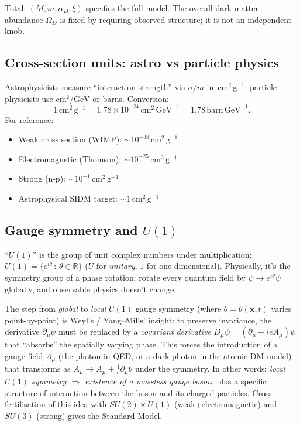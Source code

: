 \documentclass[12pt]{article}
\newcommand{\cmg}{\,\mathrm{cm^2\,g^{-1}}}
\begin{document}
Total: $(M, m, \alpha_D, \xi)$ specifies the full model.  The
overall dark-matter abundance $\Omega_D$ is fixed by requiring
observed structure; it is not an independent knob.

\subsection{Cross-section units: astro vs particle physics}

Astrophysicists measure ``interaction strength'' via $\sigma/m$ in
$\cmg$; particle physicists use $\mathrm{cm}^2/\mathrm{GeV}$ or barns.
Conversion:
%
\begin{equation}
  1\cmg = 1.78\times 10^{-24}\,\mathrm{cm}^2\,\mathrm{GeV}^{-1}
       = 1.78\,\mathrm{barn}\,\mathrm{GeV}^{-1}.
\end{equation}
%
For reference:
\begin{itemize}
  \item Weak cross section (WIMP): $\sim 10^{-38}\cmg$
  \item Electromagnetic (Thomson): $\sim 10^{-25}\cmg$
  \item Strong (n-p): $\sim 10^{-1}\cmg$
  \item Astrophysical SIDM target: $\sim 1\cmg$
\end{itemize}

\subsection{Gauge symmetry and $U(1)$}
\label{app:U1}

``$U(1)$'' is the group of unit complex numbers under multiplication:
$U(1) = \{e^{i\theta}\,:\,\theta\in\mathbb R\}$ ($U$ for
\emph{unitary}, $1$ for one-dimensional).  Physically, it's the
symmetry group of a phase rotation: rotate every quantum field by
$\psi\to e^{i\theta}\psi$ globally, and observable physics doesn't
change.

The step from \emph{global} to \emph{local} $U(1)$ gauge symmetry
(where $\theta = \theta(\mathbf{x},t)$ varies point-by-point) is
Weyl's / Yang--Mills' insight: to preserve invariance, the
derivative $\partial_\mu\psi$ must be replaced by a
\emph{covariant derivative}
$D_\mu\psi = (\partial_\mu - ie A_\mu)\psi$ that ``absorbs'' the
spatially varying phase.  This forces the introduction of a gauge
field $A_\mu$ (the photon in QED, or a dark photon in the atomic-DM
model) that transforms as $A_\mu\to A_\mu + \tfrac{1}{e}\partial_\mu\theta$
under the symmetry.  In other words:
\emph{local $U(1)$ symmetry $\Rightarrow$ existence of a massless
gauge boson}, plus a specific structure of interaction between the
boson and its charged particles.  Cross-fertilisation of this idea
with $SU(2)\times U(1)$ (weak+electromagnetic) and $SU(3)$
(strong) gives the Standard Model.
\end{document}
